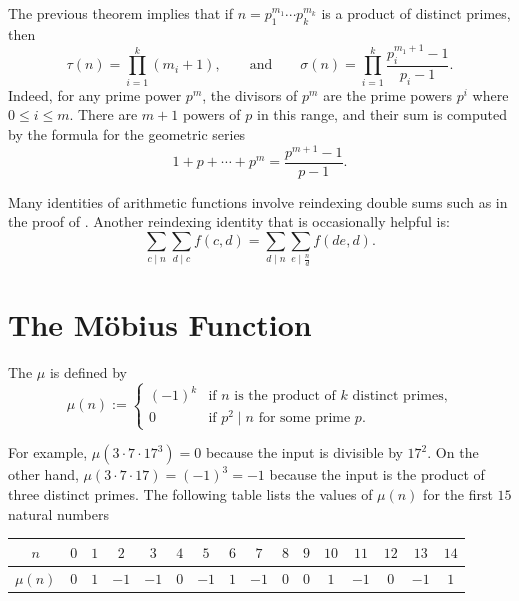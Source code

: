 The previous theorem implies that if $n=p_1^{m_1}\cdots p_k^{m_k}$ is a product of distinct primes, then
\begin{equation*}
  \tau(n)=\prod_{i=1}^k(m_i+1),\qquad\text{and}\qquad\sigma(n)=\prod_{i=1}^k\frac{p_i^{m_1+1}-1}{p_i-1}.
\end{equation*}
Indeed, for any prime power $p^m$, the divisors of $p^m$ are the prime powers $p^i$ where $0\leq i\leq m$. There are $m+1$ powers of $p$ in this range, and their sum is computed by the formula for the geometric series
\begin{equation*}
  1+p+\cdots +p^m=\frac{p^{m+1}-1}{p-1}.
\end{equation*}

\begin{remark}
  Many identities of arithmetic functions involve reindexing double sums such as in the proof of . Another reindexing identity that is occasionally helpful is:
  \begin{equation*}
    \sum_{c\mid n}\sum_{d\mid c}f(c,d)=\sum_{d\mid n}\sum_{e\mid \frac{n}{d}}f(de,d).
  \end{equation*}
\end{remark}

\section{The M\"obius Function}

\begin{definition}
  The  $\mu$ is defined by
  \begin{equation*}
    \mu(n) :=
    \begin{cases}
      (-1)^k & \text{if $n$ is the product of $k$ distinct primes,} \\
      0 & \text{if $p^2\mid n$ for some prime $p$.}
    \end{cases}
  \end{equation*}
\end{definition}

For example, $\mu(3\cdot 7\cdot 17^3)=0$ because the input is divisible by $17^2$. On the other hand, $\mu(3\cdot 7\cdot 17)=(-1)^3=-1$ because the input is the product of three distinct primes.
The following table lists the values of $\mu(n)$ for the first $15$ natural numbers

\begin{center}
  \begin{tabular}{c|ccccccccccccccc}
    $n$ & $0$ & $1$ & $2$ & $3$ & $4$ & $5$ & $6$ & $7$ & $8$ & $9$ & $10$ & $11$ & $12$ & $13$ & $14$ \\ \midrule
    $\mu(n)$ & $0$ & $1$ & $-1$ & $-1$ & $0$ & $-1$ & $1$ & $-1$ & $0$ & $0$ & $1$ & $-1$ & $0$ & $-1$ & $1$
  \end{tabular}
\end{center}

